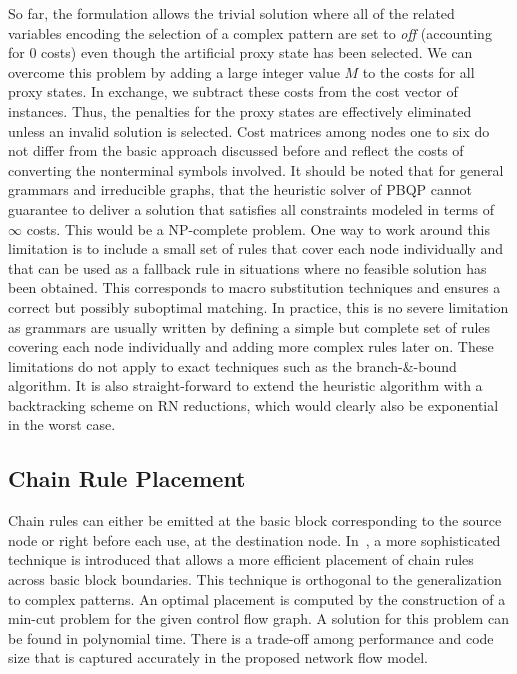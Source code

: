 So far, the formulation allows the trivial solution where all of the
related variables encoding the selection of a complex pattern are set
to \textit{off} (accounting for 0 costs) even though the artificial
proxy state has been selected. We can overcome this problem by adding
a large integer value $M$ to the costs for all proxy states. In
exchange, we subtract these costs from the cost vector of
instances. Thus, the penalties for the proxy states are effectively
eliminated unless an invalid solution is selected.
Cost matrices among nodes one to six do not differ from the basic
approach discussed before and reflect the costs of converting the
nonterminal symbols involved.
It should be noted that for general grammars and irreducible graphs,
that the heuristic solver of PBQP cannot guarantee to deliver a solution 
that satisfies all constraints modeled in terms of $\infty$ costs. This would be a
NP-complete problem. One way to work around this limitation is to
include a small set of rules that cover each node individually and
that can be used as a fallback rule in situations where no feasible
solution has been obtained. This corresponds to macro substitution
techniques and ensures a correct but possibly suboptimal matching. In
practice, this is no severe limitation as grammars are usually written
by defining a simple but complete set of rules covering each node
individually and adding more complex rules later on. These limitations
do not apply to exact techniques such as the branch-\&-bound algorithm. 
It is also straight-forward
to extend the heuristic algorithm with a backtracking scheme on RN
reductions, which would clearly also be exponential in the worst case.

\subsection{Chain Rule Placement}
\label{sec:chain_rule_placement}
Chain rules can either be emitted at the basic block corresponding to
the source node or right before each use, \ie at the destination
node. In~\cite{1269857}, a more sophisticated technique is introduced
that allows a more efficient placement of chain rules across basic
block boundaries. This technique is orthogonal to the generalization
to complex patterns. An optimal placement is computed by the
construction of a min-cut problem for the given control flow graph. A
solution for this problem can be found in polynomial time. There is a
trade-off among performance and code size that is captured accurately
in the proposed network flow model.


